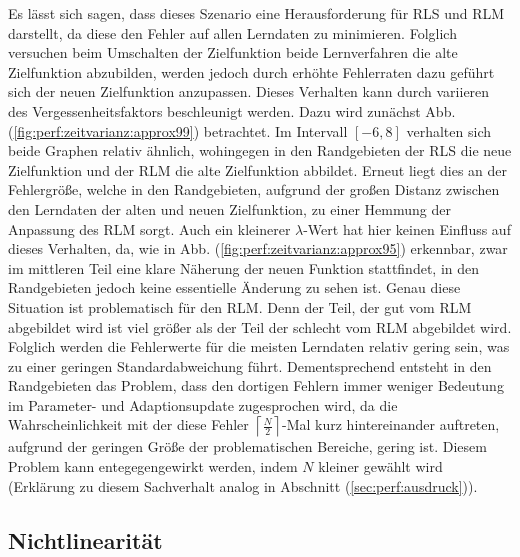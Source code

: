 \documentclass[a4paper, 12pt]{article}
\begin{document}
{Es lässt sich sagen, dass dieses Szenario eine Herausforderung für RLS und RLM darstellt, da diese den Fehler auf allen Lerndaten zu minimieren. Folglich versuchen beim Umschalten der Zielfunktion beide Lernverfahren die alte Zielfunktion abzubilden, werden jedoch durch erhöhte Fehlerraten dazu geführt sich der neuen Zielfunktion anzupassen. Dieses Verhalten kann durch variieren des Vergessenheitsfaktors beschleunigt werden. Dazu wird zunächst Abb. (\ref{fig:perf:zeitvarianz:approx99}) betrachtet. Im Intervall $[-6,8]$ verhalten sich beide Graphen relativ ähnlich, wohingegen in den Randgebieten der RLS die neue Zielfunktion und der RLM die alte Zielfunktion abbildet.
Erneut liegt dies an der Fehlergröße, welche in den Randgebieten, aufgrund der großen Distanz zwischen den Lerndaten der alten und neuen Zielfunktion, zu einer Hemmung der Anpassung des RLM sorgt.
Auch ein kleinerer $\lambda$-Wert hat hier keinen Einfluss auf dieses Verhalten, da, wie in Abb. (\ref{fig:perf:zeitvarianz:approx95}) erkennbar, zwar im mittleren Teil eine klare Näherung der neuen Funktion stattfindet, in den Randgebieten jedoch keine essentielle Änderung zu sehen ist.
Genau diese Situation ist problematisch für den RLM. Denn der Teil, der gut vom RLM abgebildet wird ist viel größer als der Teil der schlecht vom RLM abgebildet wird. Folglich werden die Fehlerwerte für die meisten Lerndaten relativ gering sein, was zu einer geringen Standardabweichung führt. Dementsprechend entsteht in den Randgebieten das Problem, dass den dortigen Fehlern immer weniger Bedeutung im Parameter- und Adaptionsupdate zugesprochen wird, da die Wahrscheinlichkeit mit der diese Fehler $\left\lceil \frac{N}{2} \right\rceil$-Mal kurz hintereinander auftreten, aufgrund der geringen Größe der problematischen Bereiche, gering ist. Diesem Problem kann entegegengewirkt werden, indem $N$ kleiner gewählt wird (Erklärung zu diesem Sachverhalt analog in Abschnitt (\ref{sec:perf:ausdruck})).

\subsection{Nichtlinearität}
\label{sec:perf:nichtlinear}

}
\end{document}
